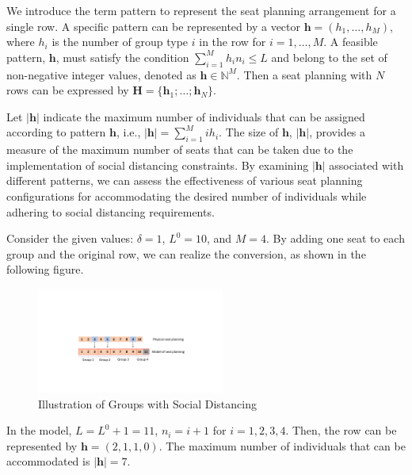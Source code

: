 
We introduce the term pattern to represent the seat planning arrangement for a single row. A specific pattern can be represented by a vector $\bm{h} = (h_1, \ldots, h_M)$, where $h_i$ is the number of group type $i$ in the row for $i = 1,\ldots, M$. A feasible pattern, $\bm{h}$, must satisfy the condition $\sum_{i=1}^{M} h_i n_i \leq L$ and belong to the set of non-negative integer values, denoted as $\bm{h} \in \mathbb{N}^{M}$. Then a seat planning with $N$ rows can be expressed by $\bm{H} = \{\bm{h}_1; \ldots; \bm{h}_N\}$.
  
Let $|\bm{h}|$ indicate the maximum number of individuals that can be assigned according to pattern $\bm{h}$, i.e., $|\bm{h}| = \sum_{i =1}^{M} i h_i$. The size of $\bm{h}$, $|\bm{h}|$, provides a measure of the maximum number of seats that can be taken due to the implementation of social distancing constraints. By examining $|\bm{h}|$ associated with different patterns, we can assess the effectiveness of various seat planning configurations for accommodating the desired number of individuals while adhering to social distancing requirements.

\begin{example}
Consider the given values: $\delta = 1$, $L^{0} = 10$, and $M = 4$. By adding one seat to each group and the original row, we can realize the conversion, as shown in the following figure.

\begin{figure}[ht]
    \centering
        \includegraphics[width=0.55\textwidth]{./Figures/illustration.pdf}
    \caption{Illustration of Groups with Social Distancing}
\end{figure}

In the model, $L = L^{0} + 1 =11$, $n_i = i + 1$ for $i = 1, 2, 3, 4$. Then, the row can be represented by $\bm{h} = (2,1,1,0)$. The maximum number of individuals that can be accommodated is $|\bm{h}| = 7$.
\end{example}

